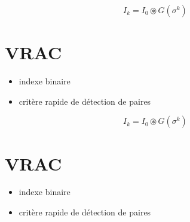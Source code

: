 \begin{equation}
     I_k = I_0  \circledast G(\sigma^k)
\end{equation}


\section{VRAC}

\begin{itemize}
   \item indexe binaire
    \item crit\`ere rapide de d\'etection de paires
\end{itemize}



\begin{equation}
     I_k = I_0  \circledast G(\sigma^k)
\end{equation}


\section{VRAC}

\begin{itemize}
   \item indexe binaire
    \item crit\`ere rapide de d\'etection de paires
\end{itemize}

